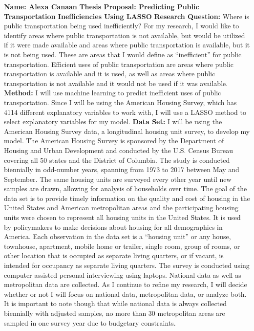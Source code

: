 \documentclass{article}
\begin{document}


\noindent \textbf{Name: Alexa Canaan}
\newline \noindent \textbf{Thesis Proposal: Predicting Public Transportation Inefficiencies Using LASSO}
\newline
\newline \textbf{Research Question:}
\newline Where is public transportation being used inefficiently? For my research, I would like to identify areas where public transportation is not available, but would be utilized if it were made available and areas where public transportation is available, but it is not being used. These are areas that I would define as “inefficient” for public transportation. Efficient uses of public transportation are areas where public transportation is available and it is used, as well as areas where public transportation is not available and it would not be used if it was available.
\newline
\newline \textbf{Method:}
\newline I will use machine learning to predict inefficient uses of public transportation. Since I will be using the American Housing Survey, which has 4114 different explanatory variables to work with, I will use a LASSO method to select explanatory variables for my model. 
\newline
\newline \noindent \textbf{Data Set:}
\newline I will be using the American Housing Survey data, a longitudinal housing unit survey, to develop my model. The American Housing Survey is sponsored by the Department of Housing and Urban Development and conducted by the U.S. Census Bureau covering all 50 states and the District of Columbia. The study is conducted biennially in odd-number years, spanning from 1973 to 2017 between May and September. The same housing units are surveyed every other year until new samples are drawn, allowing for analysis of households over time. The goal of the data set is to provide timely information on the quality and cost of housing in the United States and American metropolitan areas and the participating housing units were chosen to represent all housing units in the United States. It is used by policymakers to make decisions about housing for all demographics in America. 
\newline
\newline Each observation in the data set is a “housing unit” or any house, townhouse, apartment, mobile home or trailer, single room, group of rooms, or other location that is occupied as separate living quarters, or if vacant, is intended for occupancy as separate living quarters. The survey is conducted using computer-assisted personal interviewing using laptops. National data as well as metropolitan data are collected. As I continue to refine my research, I will decide whether or not I will focus on national data, metropolitan data, or analyze both. It is important to note though that while national data is always collected biennially with adjusted samples, no more than 30 metropolitan areas are sampled in one survey year due to budgetary constraints.
\end{document}
